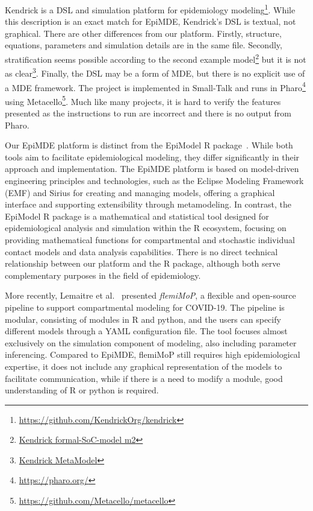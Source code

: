 Kendrick \cite{Kendrick} is a DSL and simulation platform for epidemiology modeling\footnote{\url{https://github.com/KendrickOrg/kendrick}}. While this description is an exact match for EpiMDE, Kendrick's DSL is textual, not graphical. There are other differences from our platform. Firstly, structure, equations, parameters and simulation details are in the same file.
Secondly, stratification seems possible according to the second example model\footnote{\href{https://github.com/KendrickOrg/kendrick/blob/c84ad7ba63b42332efed1ef66aaceba0566d2549/documentation/formal-SoC-models/m2.md?plain=1\#L24-L26}{Kendrick formal-SoC-model m2}} but it is not as clear\footnote{\href{https://github.com/KendrickOrg/kendrick/blob/c84ad7ba63b42332efed1ef66aaceba0566d2549/documentation/meta-model/meta-modelv3.org?plain=1\#L47-L52}{Kendrick MetaModel}}.
Finally, the DSL may be a form of MDE, but there is no explicit use of a MDE framework.
The project is implemented in Small-Talk and runs in Pharo\footnote{\url{https://pharo.org/}} using Metacello\footnote{\url{https://github.com/Metacello/metacello}}.
Much like many projects, it is hard to verify the features presented as the instructions to run are incorrect and there is no output from Pharo.

Our EpiMDE platform is distinct from the EpiModel R package~\cite{jenness2018epimodel}. While both tools aim to facilitate epidemiological modeling, they differ significantly in their approach and implementation. The EpiMDE platform is based on model-driven engineering principles and technologies, such as the Eclipse Modeling Framework (EMF) and Sirius for creating and managing models, offering a graphical interface and supporting extensibility through metamodeling. In contrast, the EpiModel R package is a mathematical and statistical tool designed for epidemiological analysis and simulation within the R ecosystem, focusing on providing mathematical functions for compartmental and stochastic individual contact models and data analysis capabilities. There is no direct technical relationship between our platform and the R package, although both serve complementary purposes in the field of epidemiology.

More recently, Lemaitre et al.~\cite{lemaitre2024flepimop} presented \emph{flemiMoP}, a flexible and open-source pipeline to support compartmental modeling for COVID-19. The pipeline is modular, consisting of modules in R and python, and the users can specify different models through a YAML configuration file. The tool focuses almost exclusively on the simulation component of modeling, also including parameter inferencing. Compared to EpiMDE, flemiMoP still requires high epidemiological expertise, it does not include any graphical representation of the models to facilitate communication, while if there is a need to modify a module, good understanding of R or python is required.

